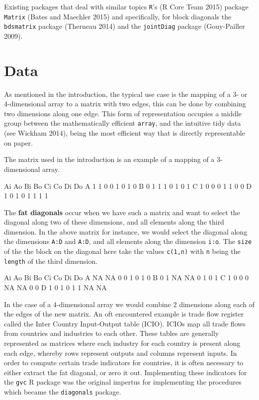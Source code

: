 \documentclass[article]{jss}
\begin{document}
Existing packages that deal with similar topics \texttt{R}'s (R Core
Team 2015) package \texttt{Matrix} (Bates and Maechler 2015) and
specifically, for block diagonals the \texttt{bdsmatrix} package
(Therneau 2014) and the \texttt{jointDiag} package (Gouy-Pailler 2009).

\section{Data}\label{data}

As mentioned in the introduction, the typical use case is the mapping of
a 3- or 4-dimensional array to a matrix with two edges, this can be done
by combining two dimensions along one edge. This form of representation
occupies a middle group between the mathematically efficient
\texttt{array}, and the intuitive tidy data (see Wickham 2014), being
the most efficient way that is directly representable on paper.

The matrix used in the introduction is an example of a mapping of a
3-dimensional array.

\begin{CodeChunk}
\begin{CodeOutput}
  Ai Ao Bi Bo Ci Co Di Do
A  1  1  0  0  1  0  1  0
B  0  1  1  1  0  1  0  1
C  1  0  0  0  1  1  0  0
D  1  0  1  0  1  1  1  1
\end{CodeOutput}
\end{CodeChunk}

The \textbf{fat diagonals} occur when we have such a matrix and want to
select the diagonal along two of these dimensions, and all elements
along the third dimension. In the above matrix for instance, we would
select the diagonal along the dimensions \texttt{A:D} and \texttt{A:D},
and all elements along the dimension \texttt{i:o}. The \texttt{size} of
the the block on the diagonal here take the values \texttt{c(1,n)} with
\texttt{n} being the \texttt{length} of the third dimension.

\begin{CodeChunk}
\begin{CodeOutput}
  Ai Ao Bi Bo Ci Co Di Do
A NA NA  0  0  1  0  1  0
B  0  1 NA NA  0  1  0  1
C  1  0  0  0 NA NA  0  0
D  1  0  1  0  1  1 NA NA
\end{CodeOutput}
\end{CodeChunk}

In the case of a 4-dimensional array we would combine 2 dimensions along
each of the edges of the new matrix. An oft encountered example is trade
flow register called the Inter Country Input-Output table (ICIO). ICIOs
map all trade flows from countries and industries to each other. These
tables are generally represented as matrices where each industry for
each country is present along each edge, whereby rows represent outputs
and columns represent inputs. In order to compute certain trade
indicators for countries, it is often necessary to either extract the
fat diagonal, or zero it out. Implementing these indicators for the
\texttt{gvc} R package was the original impertus for implementing the
procedures which became the \texttt{diagonals} package.
\end{document}
